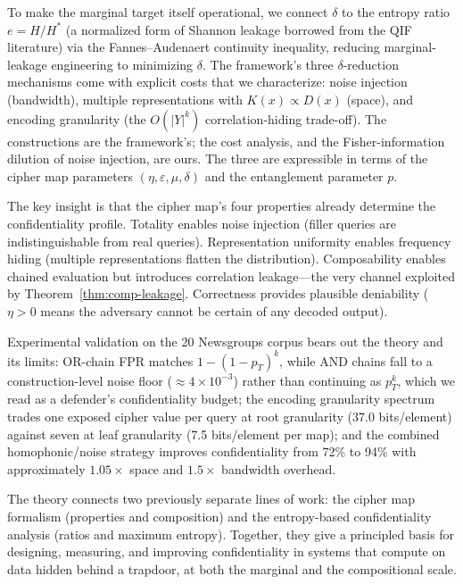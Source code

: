 \documentclass[conference]{IEEEtran}
\theoremstyle{definition}
\theoremstyle{plain}
\theoremstyle{remark}
\begin{document}
To make the marginal target itself operational, we connect $\delta$ to
the entropy ratio $e = H/H^*$ (a normalized form of Shannon leakage
borrowed from the QIF literature) via the Fannes--Audenaert continuity
inequality, reducing marginal-leakage engineering to minimizing
$\delta$.  The framework's three $\delta$-reduction mechanisms come
with explicit costs that we characterize: noise injection (bandwidth),
multiple representations with $K(x) \propto D(x)$ (space), and encoding
granularity (the $O(|Y|^k)$ correlation-hiding trade-off).  The
constructions are the framework's; the cost analysis, and the
Fisher-information dilution of noise injection, are ours.  The three
are expressible in terms of the cipher map parameters
$(\eta, \varepsilon, \mu, \delta)$ and the entanglement parameter $p$.

The key insight is that the cipher map's four properties already
determine the confidentiality profile.  Totality enables noise injection
(filler queries are indistinguishable from real queries).  Representation
uniformity enables frequency hiding (multiple representations flatten the
distribution).  Composability enables chained evaluation but introduces
correlation leakage---the very channel exploited by Theorem~\ref{thm:comp-leakage}.
Correctness provides plausible deniability
($\eta > 0$ means the adversary cannot be certain of any decoded output).

Experimental validation on the 20 Newsgroups corpus bears out the theory
and its limits: OR-chain FPR matches $1 - (1 - p_T)^k$, while AND chains
fall to a construction-level noise floor ($\approx 4 \times 10^{-3}$)
rather than continuing as $p_T^k$, which we read as a defender's
confidentiality budget; the encoding granularity spectrum trades one
exposed cipher value per query at root granularity (37.0 bits/element)
against seven at leaf granularity (7.5 bits/element per map); and the
combined homophonic/noise strategy improves confidentiality from 72\% to
94\% with approximately $1.05\times$ space and $1.5\times$ bandwidth
overhead.

The theory connects two previously separate lines of work: the cipher map
formalism (properties and composition) and the entropy-based
confidentiality analysis (ratios and maximum entropy).  Together, they
give a principled basis for designing, measuring, and improving
confidentiality in systems that compute on data hidden behind a trapdoor,
at both the marginal and the compositional scale.
\end{document}
